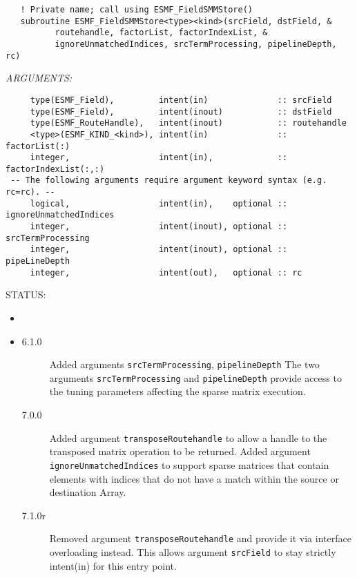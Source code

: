    
\begin{verbatim}   ! Private name; call using ESMF_FieldSMMStore() 
   subroutine ESMF_FieldSMMStore<type><kind>(srcField, dstField, & 
          routehandle, factorList, factorIndexList, &
          ignoreUnmatchedIndices, srcTermProcessing, pipelineDepth, rc)
   \end{verbatim}{\em ARGUMENTS:}
\begin{verbatim}     type(ESMF_Field),         intent(in)              :: srcField  
     type(ESMF_Field),         intent(inout)           :: dstField  
     type(ESMF_RouteHandle),   intent(inout)           :: routehandle
     <type>(ESMF_KIND_<kind>), intent(in)              :: factorList(:) 
     integer,                  intent(in),             :: factorIndexList(:,:) 
 -- The following arguments require argument keyword syntax (e.g. rc=rc). --
     logical,                  intent(in),    optional :: ignoreUnmatchedIndices
     integer,                  intent(inout), optional :: srcTermProcessing
     integer,                  intent(inout), optional :: pipeLineDepth
     integer,                  intent(out),   optional :: rc
   \end{verbatim}
{\sf STATUS:}
   \begin{itemize}
   \item{}
   \item{}
   \begin{description}
   \item[6.1.0] Added arguments {\tt srcTermProcessing}, {\tt pipelineDepth}
                The two arguments {\tt srcTermProcessing} and {\tt pipelineDepth}
                provide access to the tuning parameters affecting the sparse matrix
                execution. 
   \item[7.0.0] Added argument {\tt transposeRoutehandle} to allow a handle to
                the transposed matrix operation to be returned.\newline
                Added argument {\tt ignoreUnmatchedIndices} to support sparse 
                matrices that contain elements with indices that do not have a
                match within the source or destination Array.
   \item[7.1.0r] Removed argument {\tt transposeRoutehandle} and provide it
                via interface overloading instead. This allows argument 
                {\tt srcField} to stay strictly intent(in) for this entry point.
   \end{description}
   \end{itemize}
  

